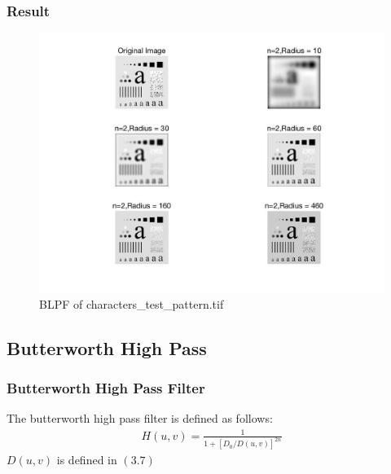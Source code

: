 \documentclass[11pt,oneside]{book}
\begin{document}
\subsubsection{Result}
\begin{figure}[!htb]
   \centering  
   \includegraphics[width=1.0\textwidth]{images/3/BLPF.jpg}
   \caption{BLPF of characters\_test\_pattern.tif}  
\end{figure}

\subsection{Butterworth High Pass}
\subsubsection{Butterworth High Pass Filter}
The butterworth high pass filter is defined as follows:\\
\begin{align}
H(u,v)=\frac{1}{1+[D_0/D(u,v)]^{2n}}
\end{align}
$D(u,v)$ is defined in $(3.7)$
\end{document}
